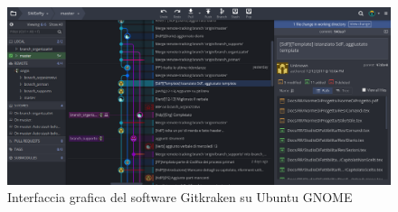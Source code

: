 		\begin{figure}[h]
			\centering
			\includegraphics[width=1\textwidth]{Images/gitkraken.png}
			\caption{Interfaccia grafica del software Gitkraken su Ubuntu GNOME}
		\end{figure}
